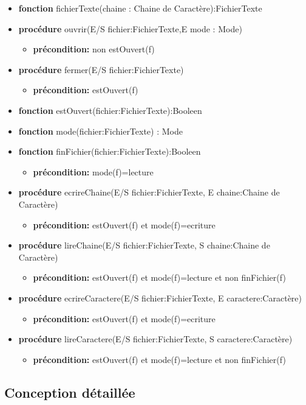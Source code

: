 	\begin{itemize}[label=$\ $, leftmargin=1cm]
		 \item \textbf{fonction} fichierTexte(chaine : Chaine de Caractère):FichierTexte
		 \item \textbf{procédure} ouvrir(E/S fichier:FichierTexte,E mode : Mode)
		 \begin{itemize}[label=$| $]
            \item \textbf{précondition:} non estOuvert(f)
         \end{itemize}
         \item \textbf{procédure} fermer(E/S fichier:FichierTexte)
		 \begin{itemize}[label=$| $]
            \item \textbf{précondition:} estOuvert(f)
         \end{itemize}
		 \item \textbf{fonction} estOuvert(fichier:FichierTexte):Booleen
		 \item \textbf{fonction} mode(fichier:FichierTexte) : Mode
		 \item \textbf{fonction} finFichier(fichier:FichierTexte):Booleen
		 \begin{itemize}[label=$| $]
            \item \textbf{précondition:} mode(f)=lecture
         \end{itemize}
         \item \textbf{procédure} ecrireChaine(E/S fichier:FichierTexte, E chaine:Chaine de Caractère)
         \begin{itemize}[label=$| $]
            \item \textbf{précondition:} estOuvert(f) et mode(f)=ecriture
         \end{itemize}
         \item \textbf{procédure} lireChaine(E/S fichier:FichierTexte, S chaine:Chaine de Caractère)
         \begin{itemize}[label=$| $]
            \item \textbf{précondition:} estOuvert(f) et mode(f)=lecture et non finFichier(f)
         \end{itemize}
         \item \textbf{procédure} ecrireCaractere(E/S fichier:FichierTexte, E caractere:Caractère)
         \begin{itemize}[label=$| $]
            \item \textbf{précondition:} estOuvert(f) et mode(f)=ecriture
         \end{itemize}
         \item \textbf{procédure} lireCaractere(E/S fichier:FichierTexte, S caractere:Caractère)
         \begin{itemize}[label=$| $]
            \item \textbf{précondition:} estOuvert(f) et mode(f)=lecture et non finFichier(f)
         \end{itemize}

	\end{itemize} 
    
    \subsection*{Conception détaillée}


